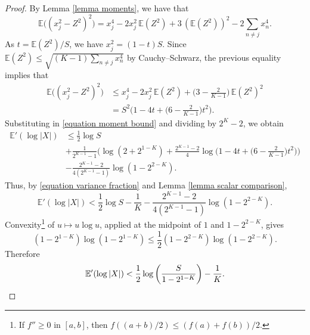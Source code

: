 \documentclass[10pt,a4paper]{amsart}
\newcommand{\EE}{\mathbb{E}}
\begin{document}
\begin{proof}
By Lemma \ref{lemma moments}, we have that
$$ \EE\big((x_j^2-Z^2)^2\big) = x_j^4-2x_j^2\,\EE(Z^2)+3\,(\EE(Z^2))^2-2\sum_{n\neq j}x_n^4. $$
As $t = \EE(Z^2)/S$, we have $x_j^2=(1-t)S$. Since $\EE(Z^2)\leq\sqrt{(K-1)\sum_{n\neq j} x_n^4}$ by Cauchy--Schwarz, the previous equality implies that
\begin{align*}
\EE\big((x_j^2-Z^2)^2\big) &\leq x_j^4- 2x_j^2\,\EE(Z^2)+\bigg(3-\frac{2}{K-1}\bigg)\,\EE(Z^2)^2\\
&=S^2\bigg(1-4t+\bigg(6-\frac{2}{K-1}\bigg)t^2\bigg).
\end{align*}
Substituting in \eqref{equation moment bound} and dividing by $2^K-2$, we obtain
\begin{align*}
\EE'(\log|X|) &\leq \frac{1}{2}\log S \\
&+\frac{1}{2^{K-1}-1}\bigg(\log(2+2^{1-K}) +\frac{2^{K-1}-2}{4} \log\bigg(1-4t+\bigg(6-\frac{2}{K-1}\bigg)t^2\bigg)\bigg) \\
&-\frac{2^{K-1}-2}{4(2^{K-1}-1)}\log(1-2^{2-K}).
\end{align*}
Thus, by \eqref{equation variance fraction} and Lemma \ref{lemma scalar comparison},
$$ \EE'(\log|X|)<\frac{1}{2}\log S-\frac{1}{K} -\frac{2^{K-1}-2}{4(2^{K-1}-1)}\log(1-2^{2-K}). $$
Convexity\footnote{If $f''\geq 0$ in $[a,b]$, then $f((a+b)/2) \leq (f(a)+f(b))/2$.} of $u\mapsto u\log u$, applied at the midpoint of $1$ and $1-2^{2-K}$, gives
$$ (1-2^{1-K})\log(1-2^{1-K}) \leq\frac{1}{2}(1-2^{2-K})\log(1-2^{2-K}). $$
Therefore
\[ \EE'(\log|X|) < \frac{1}{2}\log\bigg(\frac{S}{1-2^{1-K}}\bigg)-\frac{1}{K}. \qedhere \]
\end{proof}
\end{document}
